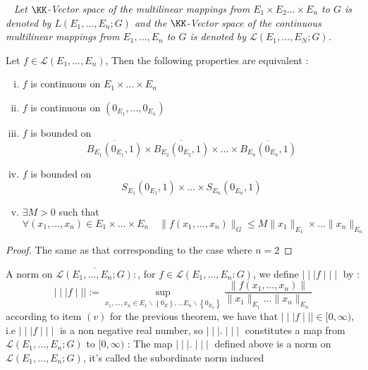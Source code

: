 \divider
\lefthand ~
\it 
Let $\KK$-Vector space of the multilinear mappings
from $E_1 \times E_2 \hdots \times E_{n}   $ to $G $ 
is denoted by $L\left(  E_1, \hdots , E_{n};G \right) $
and the $\KK $-Vector space of the continuous multilinear mappings
from $E_1, \hdots , E_{n}$ to $G $ is denoted by
$\mathcal{L}  \left( E_1, \hdots , E_{N} ; G \right) $.
\divider
\normalfont
\begin{theorem}[Fundamental]
Let $f \in  \mathcal{L} (E_1, \hdots , E_{n})  $,
Then the following properties are equivalent : 
\begin{enumerate}[(i)]
\item $f $ is continuous on $E_1 \times \hdots \times E_{n}   $ 
\item $f $ is continuous on $ \left( 0_{E_1}, \hdots , 
	0_{E_{n}}\right)$  
\item $f $ is bounded on 
	\[
		\overline{B_{E_1}(0_{E_1},1) }
		\times 
		\overline{B_{E_2}(0_{E_2},1) } 
		\times  
		\hdots  \times 
		\overline{B_{E_{n}}(0_{E_n},1) }
	\]
\item $f $ is bounded on 
	\[
	S_{E_1}(0_{E_1}, 1)  
	\times  \hdots \times  S_{E_{n}}  (0_{E_{n}},1) 
	\]
\item $\exists M > 0 $  such that
	\[
	\forall (x_1, \hdots , x_{n})  \in 
	E_1 \times \hdots \times E_{n} \quad 
	\| f(x_1, \hdots , x_{n})  \| _{G} \leq 
	M \| x_1 \| _{E_1} \times \hdots  \| x_{n} \|  _{E_{n}}
	\]
\end{enumerate}
\end{theorem}
\begin{proof}
The same as that corresponding to the case where $n = 2$ 
\end{proof}
\divider
A norm on $\overline{\mathcal{L} (E_1, \hdots , E_{n}; G) } : $, for $f \in  \mathcal{L} (
E_1, \hdots , E_{n} : G )  $, we define $\mid \mid \mid  f \mid \mid \mid  $ by : 
\[
\mid \mid \mid  f \mid \mid \mid  :=
\sup_{ x_1, \hdots ,x_{n} \in E_1 \backslash \left\{ 0_{E} \right\}, 
\hdots E_n \backslash \left\{ 0_{E_n } \right\}}  
\frac{\| f(x_1, \hdots , x_{n})  \| }{ 
\| x_1 \| _{E_1} \hdots \| x_n  \| _{E_n }}
\]
according to item $(v)$ for the previous theorem, we have
that $\mid \mid \mid  f \mid \mid \mid \in [0,\infty ) $, i.e 
$\mid \mid \mid  f \mid \mid \mid  $ is a non negative real number, so 
$\mid \mid \mid  . \mid \mid \mid  $ constitutes a map from
$\mathcal{L} (E_1, \hdots , E_n ;G)  $  to $[0,\infty ) $ :
\divider
The map $\mid \mid \mid  . \mid \mid \mid  $ defined above is a norm
on $\mathcal{L} (E_1, \hdots , E_n ; G)  $, it's called the subordinate norm induced
